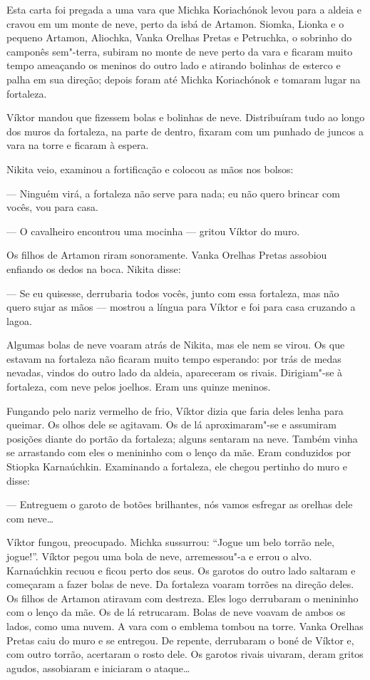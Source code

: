 Esta carta foi pregada a uma vara que Michka Koriachónok levou para a
aldeia e cravou em um monte de neve, perto da isbá de Artamon. Siomka,
Lionka e o pequeno Artamon, Aliochka, Vanka Orelhas Pretas e Petruchka,
o sobrinho do camponês sem"-terra, subiram no monte de neve perto da vara
e ficaram muito tempo ameaçando os meninos do outro lado e atirando
bolinhas de esterco e palha em sua direção; depois foram até Michka
Koriachónok e tomaram lugar na fortaleza.

Víktor mandou que fizessem bolas e bolinhas de neve. Distribuíram tudo
ao longo dos muros da fortaleza, na parte de dentro, fixaram com um punhado de
juncos a vara na torre e ficaram à espera.

Nikita veio, examinou a fortificação e colocou as mãos nos bolsos:

--- Ninguém virá, a fortaleza não serve para nada; eu não quero brincar
com vocês, vou para casa.

--- O cavalheiro encontrou uma mocinha --- gritou Víktor do muro.

Os filhos de Artamon riram sonoramente. Vanka Orelhas Pretas assobiou
enfiando os dedos na boca. Nikita disse:

--- Se eu quisesse, derrubaria todos vocês, junto com essa fortaleza,
mas não quero sujar as mãos --- mostrou a língua para Víktor e foi para
casa cruzando a lagoa.

Algumas bolas de neve voaram atrás de Nikita, mas ele nem se virou. Os
que estavam na fortaleza não ficaram muito tempo esperando: por trás de
medas nevadas, vindos do outro lado da aldeia, apareceram os rivais.
Dirigiam"-se à fortaleza, com neve pelos joelhos. Eram uns quinze
meninos.

Fungando pelo nariz vermelho de frio, Víktor dizia que faria deles lenha
para queimar. Os olhos dele se agitavam. Os de lá aproximaram"-se e
assumiram posições diante do portão da fortaleza; alguns sentaram na
neve. Também vinha se arrastando com eles o menininho com o lenço da
mãe. Eram conduzidos por Stiopka Karnaúchkin. Examinando a
fortaleza, ele chegou pertinho do muro e disse:

--- Entreguem o garoto de botões brilhantes, nós vamos esfregar as
orelhas dele com neve\ldots{}

Víktor fungou, preocupado. Michka sussurrou: ``Jogue um belo torrão
nele, jogue!''. Víktor pegou uma bola de neve, arremessou"-a e errou o
alvo. Karnaúchkin recuou e ficou perto dos seus. Os garotos do outro
lado saltaram e começaram a fazer bolas de neve. Da fortaleza voaram
torrões na direção deles. Os filhos de Artamon atiravam com destreza.
Eles logo derrubaram o menininho com o lenço da mãe. Os de lá
retrucaram. Bolas de neve voavam de ambos os lados, como uma nuvem. A
vara com o emblema tombou na torre. Vanka Orelhas Pretas caiu do muro e
se entregou. De repente, derrubaram o boné de Víktor e, com outro
torrão, acertaram o rosto dele. Os garotos rivais uivaram, deram
gritos agudos, assobiaram e iniciaram o ataque\ldots{}

